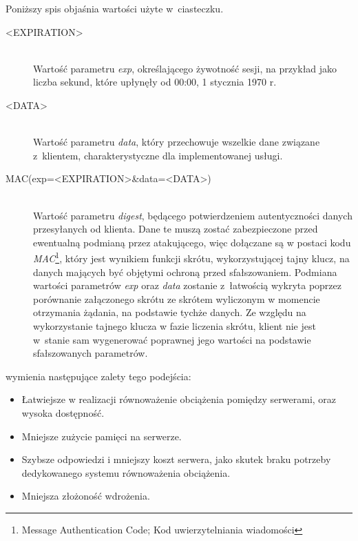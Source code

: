 \documentclass[11pt]{aghdpl}
\begin{document}
Poniższy spis objaśnia wartości użyte w~ciasteczku.
\begin{description}
\item[<EXPIRATION>] \hfill \\
Wartość parametru \emph{exp}, określającego żywotność sesji, na przykład jako liczba sekund, które upłynęły od 00:00, 1 stycznia 1970 r.
\item[<DATA>] \hfill \\
Wartość parametru \emph{data}, który przechowuje wszelkie dane związane z~klientem, charakterystyczne dla implementowanej usługi.
\item[MAC(exp=<EXPIRATION>\&data=<DATA>)] \hfill \\
Wartość parametru \emph{digest}, będącego potwierdzeniem autentyczności danych przesyłanych od klienta. Dane te muszą zostać zabezpieczone przed ewentualną podmianą przez atakującego, więc dołączane są w postaci kodu \emph{MAC}\footnote{Message Authentication Code; Kod uwierzytelniania wiadomości}, który jest wynikiem funkcji skrótu, wykorzystującej tajny klucz, na danych mających być objętymi ochroną przed sfałszowaniem. Podmiana wartości parametrów \emph{exp} oraz \emph{data} zostanie z~łatwością wykryta poprzez porównanie załączonego skrótu ze skrótem wyliczonym w momencie otrzymania żądania, na podstawie tychże danych. Ze względu na wykorzystanie tajnego klucza w fazie liczenia skrótu, klient nie jest w~stanie sam wygenerować poprawnej jego wartości na podstawie sfałszowanych parametrów.
\end{description}

\cite{SeMa08} wymienia następujące zalety tego podejścia:
\begin{itemize}
\item Łatwiejsze w realizacji równoważenie obciążenia pomiędzy serwerami, oraz wysoka dostępność.
\item Mniejsze zużycie pamięci na serwerze.
\item Szybsze odpowiedzi i mniejszy koszt serwera, jako skutek braku potrzeby dedykowanego systemu równoważenia obciążenia.
\item Mniejsza złożoność wdrożenia.
\end{itemize}
\end{document}
